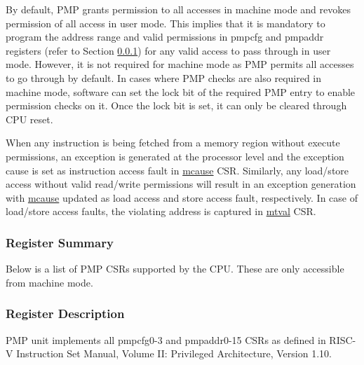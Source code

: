 \documentclass[main\_\_EN.tex]{subfiles}
\begin{document}
By default, PMP grants permission to all accesses in machine mode and revokes permission of all access in user mode. This implies that it is mandatory to program the address range and valid permissions in pmpcfg and pmpaddr registers (refer to Section \ref{sec:riscvcpu-pmp-reg-summ}) for any valid access to pass through in user mode. However, it is not required for machine mode as PMP permits all accesses to go through by default. In cases where PMP checks are also required in machine mode, software can set the lock bit of the required PMP entry to enable permission checks on it. Once the lock bit is set, it can only be cleared through CPU reset.

When any instruction is being fetched from a memory region without execute permissions, an exception is generated at the processor level and the exception cause is set as instruction access fault in \hyperref[regdesc:MCAUSE]{mcause} CSR. Similarly, any load/store access without valid read/write permissions will result in an exception generation with \hyperref[regdesc:MCAUSE]{mcause} updated as load access and store access fault, respectively. In case of load/store access faults, the violating address is captured in \hyperref[regdesc:MTVAL]{mtval} CSR.


\newpage
\hypertarget{riscvcpu-pmp-reg-summ}{}
\subsubsection{Register Summary}
\label{sec:riscvcpu-pmp-reg-summ}

Below is a list of PMP CSRs supported by the CPU. These are only accessible from machine mode.




\subsubsection{Register Description}
\label{sec:riscvcpu-pmp-reg-desc}

PMP unit implements all pmpcfg0-3 and pmpaddr0-15 CSRs as defined in RISC-V Instruction Set Manual, Volume II: Privileged Architecture, Version 1.10.



\end{document}
